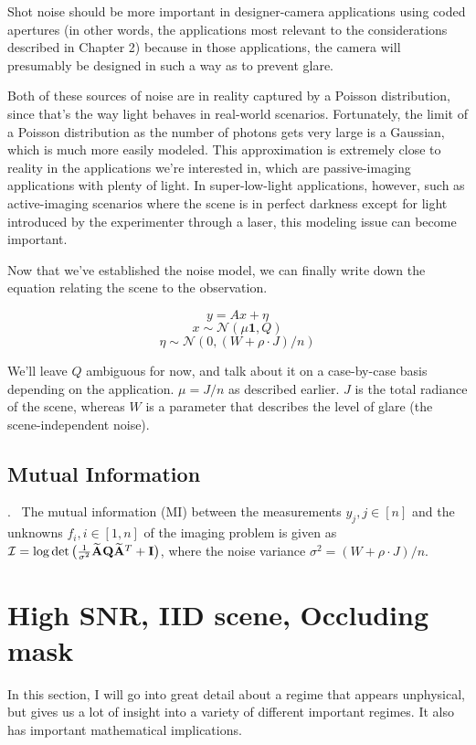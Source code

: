 Shot noise should be more important in designer-camera applications using coded apertures (in other words, the applications most relevant to the considerations described in Chapter 2) because in those applications, the camera will presumably be designed in such a way as to prevent glare.

Both of these sources of noise are in reality captured by a Poisson distribution, since that's the way light behaves in real-world scenarios. Fortunately, the limit of a Poisson distribution as the number of photons gets very large is a Gaussian, which is much more easily modeled. This approximation is extremely close to reality in the applications we're interested in, which are passive-imaging applications with plenty of light. In super-low-light applications, however, such as active-imaging scenarios where the scene is in perfect darkness except for light introduced by the experimenter through a laser, this modeling issue can become important.

Now that we've established the noise model, we can finally write down the equation relating the scene to the observation.

$$y = Ax + \eta$$
$$x \sim \mathcal{N}(\mu\mathbf{1}, Q)$$
$$\eta \sim \mathcal{N}(0,(W+\rho\cdot J)/n)$$

We'll leave $Q$ ambiguous for now, and talk about it on a case-by-case basis depending on the application. $\mu = J/n$ as described earlier. $J$ is the total radiance of the scene, whereas $W$ is a parameter that describes the level of glare (the scene-independent noise).

\subsection{Mutual Information}    

.~ The  mutual information (MI) between the measurements $y_j, j\in[n]$ and the unknowns $f_i, i\in[1,n]$ of the imaging problem is given as 
$\MI = %
\log\det\big( \frac{1}{\sigma^2}\An\Q\An^T + \Id \big)$, where the noise variance $\sigma^2 = (W + \rho \cdot J)/n$.

 
\section{High SNR, IID scene, Occluding mask}

In this section, I will go into great detail about a regime that appears unphysical, but gives us a lot of insight into a variety of different important regimes. It also has important mathematical implications.

